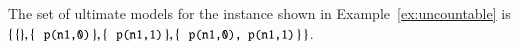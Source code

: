 \begin{example}
The set of ultimate models for the \lang instance shown in Example~\ref{ex:uncountable} is $\{ \, \{\}, \{ \, \dedalus{p(n1,0)} \, \}, \{ \, \dedalus{p(n1,1)} \, \}, \{ \, \dedalus{p(n1,0), p(n1,1)} \, \} \, \}$.
\end{example}




